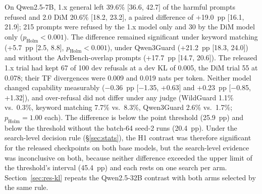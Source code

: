 On Qwen2.5-7B, 1.x general left 39.6\% [36.6, 42.7] of the harmful prompts refused and 2.0 DiM 20.6\% [18.2, 23.2],
a paired difference of +19.0~pp [16.1, 21.9]; 215 prompts were refused by the 1.x model only and 30 by the DiM model
only ($p_\mathrm{Holm}<0.001$). The difference remained significant under keyword matching (+5.7~pp [2.5, 8.8],
$p_\mathrm{Holm}<0.001$), under Qwen3Guard (+21.2~pp [18.3, 24.0]) and without the AdvBench-overlap prompts
(+17.7~pp [14.7, 20.6]). The released 1.x trial had kept 67 of 100 dev refusals at a dev KL of 0.005, the DiM trial
55 at 0.078; their TF divergences were 0.009 and 0.019 nats per token. Neither model changed capability measurably
($-$0.36~pp [$-$1.35, +0.63] and +0.23~pp [$-$0.85, +1.32]), and over-refusal did not differ under any judge
(WildGuard 1.1\% vs.\ 0.3\%, keyword matching 7.7\% vs.\ 8.3\%, Qwen3Guard 2.6\% vs.\ 1.7\%; $p_\mathrm{Holm}=1.00$
each). The difference is below the point threshold (25.9~pp) and below the threshold without the batch-64 seed-2
runs (20.4~pp). Under the search-level decision rule (\S\ref{sec:stats}), the H1 contrast was therefore significant
for the released checkpoints on both base models, but the search-level evidence was inconclusive on both, because
neither difference exceeded the upper limit of the threshold's interval (45.4~pp) and each rests on one search per
arm. Section~\ref{sec:res-kl} repeats the Qwen2.5-32B contrast with both
arms selected by the same rule.

